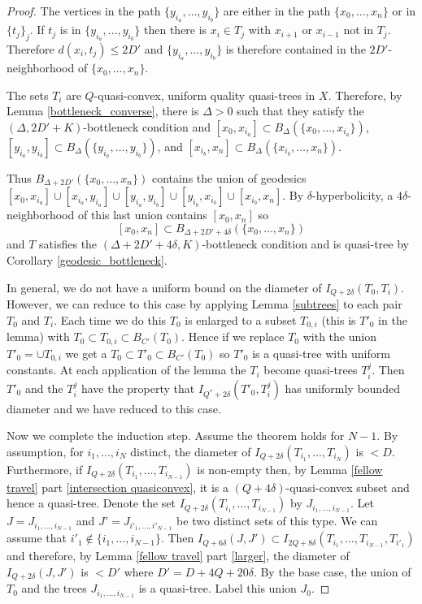 \documentclass[11pt]{article}
\theoremstyle{remark}
\begin{document}
\begin{proof}
The vertices in the path $\{y_{i_a},\ldots,y_{i_b}\}$ are either in the path $\{x_0,\ldots,x_n\}$ or in $\{t_j\}_j$. If $t_j$ is in $\{y_{i_a},\ldots,y_{i_b}\}$ then there is $x_i \in T_j$ with $x_{i+1}$ or $x_{i-1}$ not in $T_j$. Therefore $d(x_i, t_j) \le 2D'$ and $\{y_{i_a},\ldots,y_{i_b}\}$ is therefore contained in the $2D'$-neighborhood of $\{x_0,\ldots,x_n\}$.

The sets $T_i$ are $Q$-quasi-convex, uniform quality quasi-trees in $X$. Therefore, by Lemma \ref{bottleneck_converse}, there is $\Delta>0$ such that they satisfy the $(\Delta,2D'+K)$-bottleneck condition and
$[x_0, x_{i_a}] \subset B_\Delta(\{x_0, \dots, x_{i_a}\})$,
$ [y_{i_a}, y_{i_b}] \subset  B_\Delta(\{y_{i_a}, \dots, y_{i_b}\})$, and 
$ [x_{i_b}, x_n] \subset  B_\Delta(\{x_{i_b}, \dots, x_n\})$.

 Thus $B_{\Delta +2D'}(\{x_0, \dots, x_n\})$ contains the union of geodesics $[x_0, x_{i_a}] \cup [x_{i_a}, y_{i_a}] \cup [y_{i_a}, y_{i_b}] \cup [y_{i_b}, x_{i_b}] \cup [x_{i_b}, x_n]$. By $\delta$-hyperbolicity, a $4\delta$-neighborhood of this last union contains $[x_0, x_n]$ so
 $$[x_0, x_n] \subset B_{\Delta + 2D' + 4\delta}(\{x_0, \dots, x_n\})$$ and $T$ satisfies the $(\Delta + 2D'+4\delta, K)$-bottleneck condition and is quasi-tree by Corollary \ref{geodesic_bottleneck}.
 
In general, we do not have a uniform bound on the diameter of $I_{Q+2\delta}(T_0, T_i)$. However, we can reduce to this case by applying Lemma \ref{subtrees} to each pair $T_0$ and $T_i$. Each time we do this $T_0$ is enlarged to a subset $T_{0,i}$ (this is $T'_0$ in the lemma) with $T_0 \subset T_{0,i} \subset B_{C'}(T_0)$. Hence if we replace $T_0$ with the union $T'_0 =  \cup T_{0,i}$ we get a $T_0 \subset T'_{0} \subset B_{C'}(T_0)$ so $T'_0$ is a quasi-tree with uniform constants. At each application of the lemma the $T_i$ become quasi-trees $T^j_i$. Then $T'_0$ and the $T^j_i$ have the property that $I_{Q^*+2\delta}(T'_0, T^j_i)$ has uniformly bounded diameter and we have reduced to this case.

Now we complete the induction step. Assume the theorem holds for $N-1$. By assumption, for $i_1, \ldots, i_N$ distinct, the diameter of $I_{Q+2\delta}(T_{i_1}, \dots, T_{i_N})$ is $<D$.
Furthermore, if $I_{Q+2\delta}(T_{i_1}, \dots, T_{i_{N-1}})$ is non-empty then, by Lemma \ref{fellow travel} part \eqref{intersection quasiconvex}, it is a $(Q+4\delta)$-quasi-convex subset and hence a quasi-tree. Denote the set $I_{Q+2\delta}(T_{i_1},\ldots,T_{i_{N-1}})$ by $J_{{i_1}, \dots, {i_{N-1}}}$. Let $J = J_{{i_1}, \dots, {i_{N-1}}}$ and $J'=J_{{i'_1}, \dots, {i'_{N-1}}}$ be two distinct sets of this type. We can assume that $i'_1 \not\in \{i_1, \dots, i_{N-1}\}$. Then $I_{Q+6\delta}(J, J') \subset I_{2Q+ 8\delta}(T_{i_1}, \dots, T_{i_{N-1}}, T_{i'_1})$ and therefore, by Lemma \ref{fellow travel} part \eqref{larger}, the diameter of $I_{Q+2\delta}(J, J')$ is $< D'$ where $D' = D+4Q+20\delta$. By the base case, the union of $T_0$ and the trees $J_{{i_1}, \dots, {i_{N-1}}}$ is a quasi-tree. Label this union $J_0$.


\end{proof}
\end{document}
